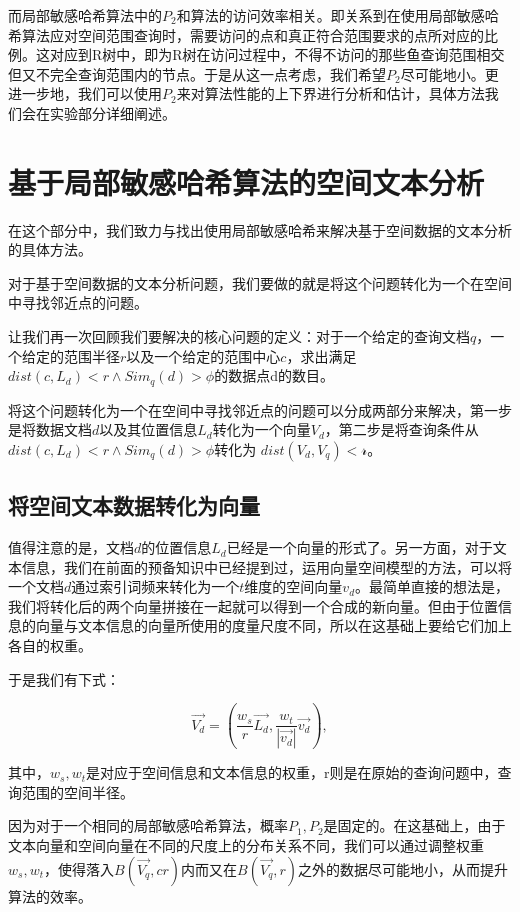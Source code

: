 而局部敏感哈希算法中的$ P_2 $和算法的访问效率相关。即关系到在使用局部敏感哈希算法应对空间范围查询时，需要访问的点和真正符合范围要求的点所对应的比例。这对应到R树中，即为R树在访问过程中，不得不访问的那些鱼查询范围相交但又不完全查询范围内的节点。于是从这一点考虑，我们希望$ P_2 $尽可能地小。更进一步地，我们可以使用$ P_2 $来对算法性能的上下界进行分析和估计，具体方法我们会在实验部分详细阐述。

\section{基于局部敏感哈希算法的空间文本分析}
\label{lsh1}

在这个部分中，我们致力与找出使用局部敏感哈希来解决基于空间数据的文本分析的具体方法。

对于基于空间数据的文本分析问题，我们要做的就是将这个问题转化为一个在空间中寻找邻近点的问题。

让我们再一次回顾我们要解决的核心问题的定义：对于一个给定的查询文档$ q $，一个给定的范围半径$ r $以及一个给定的范围中心$ c $，求出满足$ dist(c,L_d) < r \land Sim_q(d) > \phi $的数据点d的数目。

将这个问题转化为一个在空间中寻找邻近点的问题可以分成两部分来解决，第一步是将数据文档$ d $以及其位置信息$ L_d $转化为一个向量$ V_d $，第二步是将查询条件从$ dist(c,L_d) < r \land Sim_q(d) > \phi $转化为 $ dist(V_d,V_q) < \mathcal{r} $。

\subsection{将空间文本数据转化为向量}

值得注意的是，文档$ d $的位置信息$ L_d $已经是一个向量的形式了。另一方面，对于文本信息，我们在前面的预备知识中已经提到过，运用向量空间模型的方法，可以将一个文档$ d $通过索引词频来转化为一个$ t $维度的空间向量$ v_d $。最简单直接的想法是，我们将转化后的两个向量拼接在一起就可以得到一个合成的新向量。但由于位置信息的向量与文本信息的向量所使用的度量尺度不同，所以在这基础上要给它们加上各自的权重。

于是我们有下式：

\begin{equation}
	\vec{V_d} = (\frac{w_s}{r}\vec{L_d},\frac{w_t}{|\vec{v_d}|}\vec{v_d}),
\end{equation}

其中，$ w_s,w_t $是对应于空间信息和文本信息的权重，r则是在原始的查询问题中，查询范围的空间半径。

因为对于一个相同的局部敏感哈希算法，概率$ P_1,P_2 $是固定的。在这基础上，由于文本向量和空间向量在不同的尺度上的分布关系不同，我们可以通过调整权重$ w_s,w_t $，使得落入$ B(\vec{V_q},cr) $内而又在$ B(\vec{V_q},r) $之外的数据尽可能地小，从而提升算法的效率。

